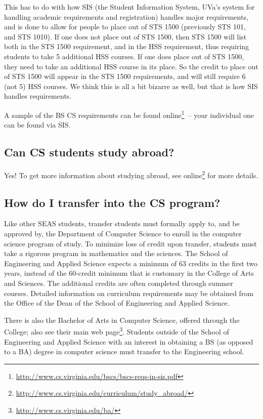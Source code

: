 \documentclass[10pt,letter]{book}
\newcommand{\myurl}[1]{\footnote{\scriptsize\url{#1}}}
\begin{document}
This has to do with how SIS (the Student Information System, UVa’s
system for handling academic requirements and registration) handles
major requirements, and is done to allow for people to place out of
STS 1500 (previously STS 101, and STS 1010). If one does not
place out of STS 1500, then STS 1500 will list both in the STS 1500
requirement, and in the HSS requirement, thus requiring students to
take 5 additional HSS courses. If one does place out of STS 1500, they
need to take an additional HSS course in its place. So the credit to
place out of STS 1500 will appear in the STS 1500 requirements, and
will still require 6 (not 5) HSS courses. We think this is all a bit
bizarre as well, but that is how SIS handles requirements.

A sample of the BS CS requirements can be found
online\myurl{http://www.cs.virginia.edu/bscs/bscs-reqs-in-sis.pdf}~--
your individual one can be found via SIS.

\subsection{Can CS students study abroad?}

Yes! To get more information about studying abroad, see
online\myurl{http://www.cs.virginia.edu/curriculum/study\_abroad/}
for more details.
 
\subsection{How do I transfer into the CS program?}

Like other SEAS students, transfer students must formally apply to,
and be approved by, the Department of Computer Science to enroll in
the computer science program of study. To minimize loss of credit upon
transfer, students must take a rigorous program in mathematics and the
sciences. The School of Engineering and Applied Science expects a
minimum of 63 credits in the first two years, instead of the 60-credit
minimum that is customary in the College of Arts and Sciences. The
additional credits are often completed through summer
courses. Detailed information on curriculum requirements may be
obtained from the Office of the Dean of the School of Engineering and
Applied Science.

There is also the Bachelor of Arts in Computer Science, offered
through the College; also see their main
web page\myurl{http://www.cs.virginia.edu/ba/}. Students
outside of the School of Engineering and Applied Science with an
interest in obtaining a BS (as opposed to a BA) degree in computer
science must transfer to the Engineering school.
\end{document}
